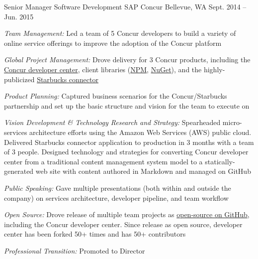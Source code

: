\begin{cventries}


\cventry
{Senior Manager Software Development}
{SAP Concur}
{Bellevue, WA}
{Sept. 2014 – Jun. 2015}
{ %
\begin{cvitems}
\item {\emph{Team Management:} Led a team of 5 Concur developers to build a variety of online service offerings to improve the adoption of the Concur platform }
\item {\emph{Global Project Management:} Drove delivery for 3 Concur products, including the \href{https://developer.concur.com}{Concur developer center}, client libraries (\href{https://www.npmjs.com/package/concur}{NPM}, \href{https://www.nuget.org/packages/ConcurPlatform/}{NuGet}), and the highly-publicized \href{http://www.bloomberg.com/news/videos/2015-02-23/concur-taking-the-pain-out-of-expense-reports}{Starbucks connector} }
\item {\emph{Product Planning:} Captured business scenarios for the Concur/Starbucks partnership and set up the basic structure and vision for the team to execute on }
\item {\emph{Vision Development \& Technology Research and Strategy:} Spearheaded micro-services architecture efforts using the Amazon Web Services (AWS) public cloud. Delivered Starbucks connector application to production in 3 months with a team of 3 people. Designed technology and strategies for converting Concur developer center from a traditional content management system model to a statically-generated web site with content authored in Markdown and managed on GitHub }
\item {\emph{Public Speaking:} Gave multiple presentations (both within and outside the company) on services architecture, developer pipeline, and team workflow }
\item {\emph{Open Source:} Drove release of multiple team projects as \href{https://github.com/concur}{open-source on GitHub}, including the Concur developer center. Since release as open source, developer center has been forked 50+ times and has 50+ contributors }
\item {\emph{Professional Transition:} Promoted to Director }
\end{cvitems}
}



\end{cventries}

